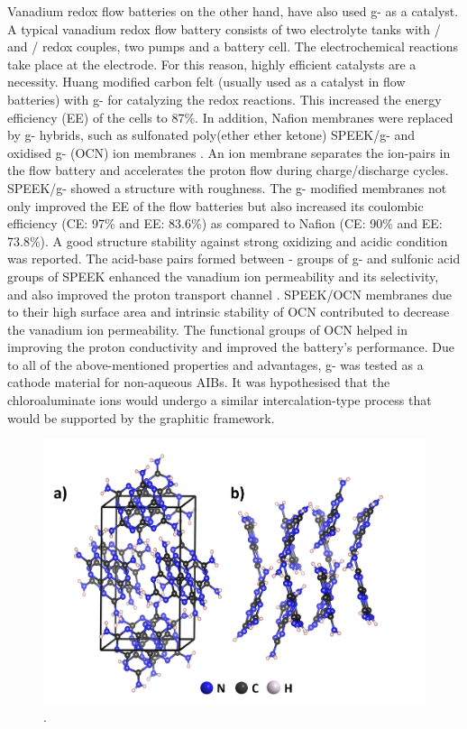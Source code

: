 Vanadium redox flow batteries on the other hand, have also used g- as a catalyst. A typical vanadium redox flow battery consists of two electrolyte tanks with / and / redox couples, two pumps and a battery cell. The electrochemical reactions take place at the electrode. For this reason, highly efficient catalysts are a necessity. Huang  modified carbon felt (usually used as a catalyst in flow batteries) with g- for catalyzing the redox reactions. This increased the energy efficiency (EE) of the cells to 87\%. In addition, Nafion membranes were replaced by g- hybrids, such as sulfonated poly(ether ether ketone) SPEEK/g- and oxidised g- (OCN) ion membranes \cite{niu_novel_2017, wang_novel_2017}. An ion membrane separates the ion-pairs in the flow battery and accelerates the proton flow during charge/discharge cycles. SPEEK/g- showed a structure with roughness. The g- modified membranes not only improved the EE of the flow batteries but also increased its coulombic efficiency (CE: 97\% and EE: 83.6\%) as compared to Nafion (CE: 90\% and EE: 73.8\%). A good structure stability against strong oxidizing and acidic condition was reported. The acid-base pairs formed between - groups of g- and sulfonic acid groups of SPEEK enhanced the vanadium ion permeability and its selectivity, and also improved the proton transport channel \cite{wang_novel_2017}. SPEEK/OCN membranes due to their high surface area and intrinsic stability of OCN contributed to decrease the vanadium ion permeability. The functional groups of OCN helped in improving the proton conductivity and improved the battery's performance. Due to all of the above-mentioned properties and advantages, g- was tested as a cathode material for non-aqueous AIBs. It was hypothesised that the chloroaluminate ions would undergo a similar intercalation-type process that would be supported by the graphitic framework.

\begin{figure}[th!]
\centering
\includegraphics[width=\textwidth]{Figures/chap6fig/C3N4crys}
\caption{.}
\label{Figures/chap6fig:C3N4crys}
\end{figure}
